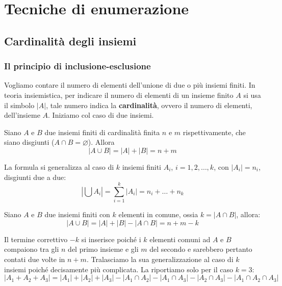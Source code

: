\chapter{Tecniche di enumerazione}

\section{Cardinalità degli insiemi}

\subsection{Il principio di inclusione-esclusione}
Vogliamo contare il numero di elementi dell'unione di due o più insiemi finiti. In teoria insiemistica, per indicare il numero di elementi di un insieme finito $A$ si usa il simbolo $|A|$, tale numero indica la \textbf{cardinalità}, ovvero il numero di elementi, dell'insieme $A$. Iniziamo col caso di due insiemi.

\begin{propbox}
	Siano $A$ e $B$ due insiemi finiti di cardinalità finita $n$ e $m$ rispettivamente, che siano disgiunti ($A \cap B = \varnothing$). Allora
	\begin{equation}
		|A \cup B| = |A| + |B| = n+m
	\end{equation}
\end{propbox}

La formula si generalizza al caso di $k$ insiemi finiti $A_{i}$, $i=1,2,\ldots, k$, con $|A_{i}|=n_{i}$, disgiunti due a due:
\begin{equation}
	|\bigcup A_{i}| = \sum_{i=1}^{k} |A_{i}| = n_{i} + \ldots + n_{k}
\end{equation}

\begin{propbox}
	Siano $A$ e $B$ due insiemi finiti con $k$ elementi in comune, ossia $k=|A \cap B|$, allora:
	\begin{equation}\label{eq:pie}
		|A \cup B| = |A| +|B| - |A \cap B| = n+m-k
	\end{equation}
\end{propbox}
Il termine correttivo $-k$ si inserisce poiché i $k$ elementi comuni ad $A$ e $B$ compaiono tra gli $n$ del primo insieme e gli $m$ del secondo e sarebbero pertanto contati due volte in $n+m$. Tralasciamo la sua generalizzazione al caso di $k$ insiemi poiché decisamente più complicata. La riportiamo solo per il caso $k=3$:
\begin{equation}\label{eq:pie2}
	|A_{1}+A_{2}+A_{3}| = |A_{1}|+|A_{2}|+|A_{3}| - |A_{1} \cap A_{2}| - |A_{1} \cap A_{3}|- |A_{2} \cap A_{3}|- |A_{1} \cap A_{2} \cap A_{3}|
\end{equation}

